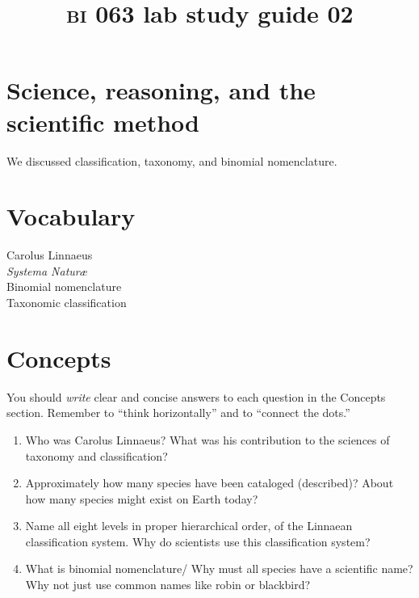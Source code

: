 \documentclass[letterpaper]{tufte-handout}
\title{{\scshape bi} 063 lab study guide 02}
\date{} %
\begin{document}
\maketitle	%

\section*{Science, reasoning, and the scientific method}

We discussed classification, taxonomy, and binomial nomenclature.

\section*{Vocabulary}

\vspace{-1\baselineskip}
\begin{multicols}{2}
Carolus Linnaeus\\
\textit{Systema Natur\ae}\\
Binomial nomenclature\\
Taxonomic classification\\
\end{multicols}

\section{Concepts}

You should \emph{write} clear and concise answers to each question in the Concepts section.  Remember to ``think horizontally'' and to ``connect the dots.'' 

\begin{enumerate}
	\item Who was Carolus Linnaeus? What was his contribution to the sciences of taxonomy and classification?

	\item Approximately how many species have been cataloged (described)? About how many species might exist on Earth today?
	
	\item Name all eight levels in proper hierarchical order, of the Linnaean classification system. Why do scientists use this classification system?
	
	\item What is binomial nomenclature/ Why must all species have a scientific name? Why not just use common names like robin or blackbird?

\end{enumerate}
\end{document}
